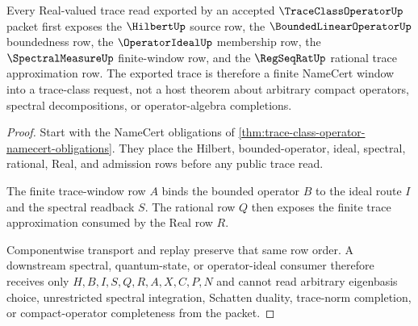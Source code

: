 \begin{theorem}
\label{thm:trace-class-operator-finite-trace-window}
Every Real-valued trace read exported by an accepted $\TraceClassOperatorUp$ packet first exposes the $\HilbertUp$ source row, the $\BoundedLinearOperatorUp$ boundedness row, the $\OperatorIdealUp$ membership row, the $\SpectralMeasureUp$ finite-window row, and the $\RegSeqRatUp$ rational trace approximation row. The exported trace is therefore a finite NameCert window into a trace-class request, not a host theorem about arbitrary compact operators, spectral decompositions, or operator-algebra completions.
\end{theorem}
\begin{proof}
Start with the NameCert obligations of \autoref{thm:trace-class-operator-namecert-obligations}. They place the Hilbert, bounded-operator, ideal, spectral, rational, Real, and admission rows before any public trace read.

The finite trace-window row $A$ binds the bounded operator $B$ to the ideal route $I$ and the spectral readback $S$. The rational row $Q$ then exposes the finite trace approximation consumed by the Real row $R$.

Componentwise transport and replay preserve that same row order. A downstream spectral, quantum-state, or operator-ideal consumer therefore receives only $H,B,I,S,Q,R,A,X,C,P,N$ and cannot read arbitrary eigenbasis choice, unrestricted spectral integration, Schatten duality, trace-norm completion, or compact-operator completeness from the packet.
\end{proof}


\begin{closurestatus}{\TraceClassOperatorUp}
  \theoryclosure{\seedClosure}
  \formalstatus{\unformalizedV}
\end{closurestatus}
